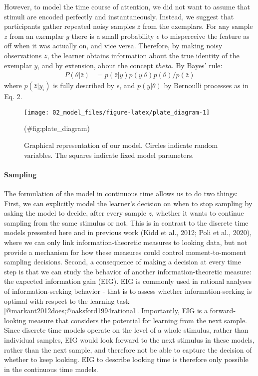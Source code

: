 \documentclass[
]{article}
\begin{document}
However, to model the time course of attention, we did not want to assume that stimuli are encoded perfectly and instantaneously. Instead, we suggest that participants gather repeated noisy samples \(\bar{z}\) from the exemplars. For any sample \(z\) from an exemplar \(y\) there is a small probability \(\epsilon\) to misperceive the feature as off when it was actually on, and vice versa.
Therefore, by making noisy observations \(\bar{z}\), the learner obtains information about the true identity of the exemplar \(y\), and by extension, about the concept \(\bar{theta}\). By Bayes' rule:
\begin{eqnarray}
P(\theta|\bar{z}) &= p(\bar{z}|y) p(y|\theta) p(\theta) / p(\bar{z})
\end{eqnarray}
where \(p(\bar{z}|y_i)\) is fully described by \(\epsilon\), and \(p(y|\theta)\) by Bernoulli processes as in Eq. 2.

\begin{figure}[H]

{\centering \texttt{[image: 02\_model\_files/figure-latex/plate\_diagram-1]} 

}

\caption{Graphical representation of our model. Circles indicate random variables. The squares indicate fixed model parameters.}(\#fig:plate_diagram)
\end{figure}

\hypertarget{sampling}{%
\paragraph{Sampling}\label{sampling}}

The formulation of the model in continuous time allows us to do two things: First, we can explicitly model the learner's decision on when to stop sampling by asking the model to decide, after every sample \(z\), whether it wants to continue sampling from the same stimulus or not. This is in contrast to the discrete time models presented here and in previous work (Kidd et al., 2012; Poli et al., 2020), where we can only link information-theoretic measures to looking data, but not provide a mechanism for how these measures could control moment-to-moment sampling decisions. Second, a consequence of making a decision at every time step is that we can study the behavior of another information-theoretic measure: the expected information gain (EIG). EIG is commonly used in rational analyses of information-seeking behavior - that is to assess whether information-seeking is optimal with respect to the learning task {[}@markant2012does;@oaksford1994rational{]}. Importantly, EIG is a forward-looking measure that considers the potential for learning from the next sample. Since discrete time models operate on the level of a whole stimulus, rather than individual samples, EIG would look forward to the next stimulus in these models, rather than the next sample, and therefore not be able to capture the decision of whether to keep looking. EIG to describe looking time is therefore only possible in the continuous time models.
\end{document}
